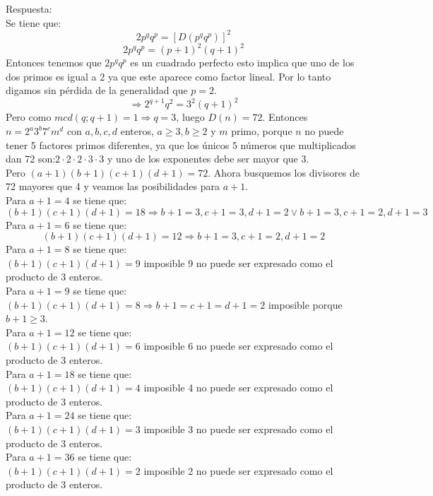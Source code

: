 \documentclass{book}
\begin{document}
\begin{enumerate}
\begin{enumerate}
        \end{enumerate}
        Respuesta:\\
        Se tiene que:
        $$2p^qq^p = {[D(p^qq^p)]}^2$$
        $$2 p^qq^p = {(p + 1)}^2{(q + 1)}^2$$
        Entonces tenemos que $2 p^qq^p$ es un cuadrado perfecto esto implica que uno de los dos primos es igual a 2 ya que este aparece como factor lineal. Por lo tanto digamos sin pérdida de la generalidad que $p= 2$.
        $$\Rightarrow 2^{q+1}q^2 = 3^2(q + 1)^2$$
        Pero como $mcd(q;q + 1) = 1 \Rightarrow q = 3$, luego $D(n) = 72$. Entonces $n = 2^a3^b7^cm^d$ con $a,b,c,d$ enteros, $a \geq 3 ,b\geq  2$ y $m$ primo, porque $n$ no puede tener 5 factores primos diferentes, ya que los únicos 5 números que multiplicados dan 72 son:$2\cdot 2\cdot 2\cdot 3\cdot 3$ y uno de los exponentes debe ser mayor que 3. \\
        Pero $(a + 1)(b + 1)(c + 1)(d + 1) = 72$. Ahora busquemos los divisores de 72 mayores que 4 y veamos las posibilidades para $a + 1$.\\
        Para $a + 1 = 4$ se tiene que:
        $$(b + 1)(c + 1)(d + 1) = 18 \Rightarrow b + 1 = 3,c + 1 = 3,d + 1 = 2
        \vee  b + 1 = 3,c + 1 = 2,d + 1 = 3$$
        Para $a + 1 = 6$ se tiene que:
        $$(b + 1)(c + 1)(d + 1) = 12 \Rightarrow b + 1 = 3,c + 1 = 2,d + 1 = 2$$
        Para $a + 1 = 8$ se tiene que:\\
        $(b + 1)(c + 1)(d + 1) = 9$ imposible 9 no puede ser expresado como el producto de 3 enteros.\\
        Para $a + 1 = 9$ se tiene que: \\
        $(b + 1)(c + 1)(d + 1) = 8 \Rightarrow b + 1 = c + 1 = d + 1 = 2$  imposible porque $b + 1 \geq 3$. \\
        Para $a + 1 = 12$ se tiene que: \\
        $(b + 1)(c + 1)(d + 1) = 6$ imposible 6 no puede ser expresado como el producto de 3 enteros. \\
        Para $a + 1 = 18$ se tiene que: \\
        $(b + 1)(c + 1)(d + 1) = 4$ imposible 4 no puede ser expresado como el producto de 3 enteros.\\
        Para $a + 1 = 24$ se tiene que: \\
        $(b + 1)(c + 1)(d + 1) = 3$ imposible 3 no puede ser expresado como el producto de 3 enteros.\\
        Para $a + 1 = 36$ se tiene que: \\
        $(b + 1)(c + 1)(d + 1) = 2$ imposible 2 no puede ser expresado como el producto de 3 enteros.\\

\end{enumerate}
\end{document}
